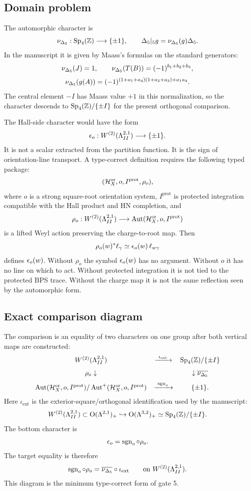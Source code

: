 \subsection{Domain problem}

The automorphic character is
\[
        \nu_{\Delta_5}:\operatorname{Sp}_4(\mathbb Z)\longrightarrow \{\pm1\},
        \qquad
        \Delta_5|_5 g=\nu_{\Delta_5}(g)\Delta_5 .
\]
In the manuscript it is given by Maass's formulas on the standard
generators:
\[
\nu_{\Delta_5}(J)=1,\qquad
\nu_{\Delta_5}(T(B))=(-1)^{b_1+b_2+b_3},
\]
\[
\nu_{\Delta_5}(g(A))
=(-1)^{(1+a_1+a_4)(1+a_2+a_3)+a_1a_4}.
\]
The central element \(-I\) has Maass value \(+1\) in this normalization,
so the character descends to \(\operatorname{Sp}_4(\mathbb Z)/\{\pm I\}\) for the present
orthogonal comparison.

The Hall-side character would have the form
\[
        \epsilon_o:W^{(2)}(\Lambda^{2,1}_{II})\longrightarrow \{\pm1\}.
\]
It is not a scalar extracted from the partition function.  It is the
sign of orientation-line transport.  A type-correct definition requires
the following typed package:
\[
(\mathcal H_X^{\mathrm{or}},o,I^{\mathrm{prot}},\rho_o),
\]
where \(o\) is a strong square-root orientation system, \(I^{\mathrm{prot}}\)
is protected integration compatible with the Hall product and HN
completion, and
\[
        \rho_o:W^{(2)}(\Lambda^{2,1}_{II})\longrightarrow
        \operatorname{Aut}(\mathcal H_X^{\mathrm{or}},o,I^{\mathrm{prot}})
\]
is a lifted Weyl action preserving the charge-to-root map.  Then
\[
        \rho_o(w)^*\ell_{\gamma}
        \simeq
        \epsilon_o(w)\,\ell_{w\gamma}
\]
defines \(\epsilon_o(w)\).  Without \(\rho_o\) the symbol \(\epsilon_o(w)\) has
no argument.  Without \(o\) it has no line on which to act.  Without
protected integration it is not tied to the protected BPS trace.  Without
the charge map it is not the same reflection seen by the automorphic
form.

\subsection{Exact comparison diagram}

The comparison is an equality of two characters on one group after both
vertical maps are constructed:
\[
\begin{array}{ccc}
W^{(2)}(\Lambda^{2,1}_{II})
& \xrightarrow{\ \iota_{\mathrm{ext}}\ } &
\operatorname{Sp}_4(\mathbb Z)/\{\pm I\}
\\[0.7em]
\rho_o \downarrow
&&
\downarrow \overline{\nu_{\Delta_5}}
\\[0.7em]
\operatorname{Aut}(\mathcal H_X^{\mathrm{or}},o,I^{\mathrm{prot}})
    /\operatorname{Aut}^+(\mathcal H_X^{\mathrm{or}},o,I^{\mathrm{prot}})
& \xrightarrow{\ \operatorname{sgn}_o\ } &
\{\pm1\}.
\end{array}
\]
Here \(\iota_{\mathrm{ext}}\) is the exterior-square/orthogonal
identification used by the manuscript:
\[
W^{(2)}(\Lambda^{2,1}_{II})\subset \operatorname{O}(\Lambda^{2,1})_+
\hookrightarrow \operatorname{O}(\Lambda^{3,2})_+
\simeq \operatorname{Sp}_4(\mathbb Z)/\{\pm I\}.
\]
The bottom character is
\[
        \epsilon_o=\operatorname{sgn}_o\circ\rho_o.
\]
The target equality is therefore
\[
        \operatorname{sgn}_o\circ\rho_o
        =
        \overline{\nu_{\Delta_5}}\circ\iota_{\mathrm{ext}}
        \qquad\hbox{on }W^{(2)}(\Lambda^{2,1}_{II}) .
\]
This diagram is the minimum type-correct form of gate 5.

